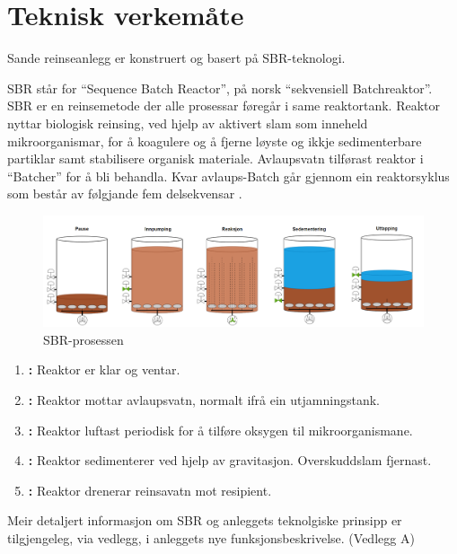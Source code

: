 \newpage
\section{Teknisk verkemåte}
\thispagestyle{fancy}
Sande reinseanlegg er konstruert og basert på \gls{SBR}-teknologi.

\gls{SBR} står for ``Sequence \Gls{Batch} Reactor'', på norsk ``sekvensiell \gls{Batch}reaktor''.\newline
\gls{SBR} er en reinsemetode der alle prosessar føregår i same reaktortank. 
Reaktor nyttar biologisk reinsing, ved hjelp av aktivert slam som inneheld mikroorganismar, for å koagulere 
og å fjerne løyste og ikkje sedimenterbare partiklar samt stabilisere organisk materiale. 
Avlaupsvatn tilførast reaktor i ``\gls{Batch}er'' for å bli behandla. 
Kvar avlaups-\gls{Batch} går gjennom ein reaktorsyklus som består av følgjande fem delsekvensar \citep{Statsforvalter}.
\newline

\begin{figure}[htbp]
    \centering
    \includegraphics[width=1\textwidth]{Figurar/SBR-V2.png}
    \caption{\gls{SBR}-prosessen}\label{fig:SBR-Prosessen}
\end{figure}


\begin{enumerate}
    \item \textbf{:} Reaktor er klar og ventar.
    \item \textbf{:} Reaktor mottar avlaupsvatn, normalt ifrå ein utjamningstank.
    \item \textbf{:} Reaktor luftast periodisk for å tilføre oksygen til mikroorganismane.
    \item \textbf{:} Reaktor sedimenterer ved hjelp av gravitasjon. Overskuddslam fjernast.
    \item \textbf{:} Reaktor drenerar reinsavatn mot resipient.
\end{enumerate}

Meir detaljert informasjon om \gls{SBR} og anleggets teknolgiske prinsipp er tilgjengeleg, via vedlegg, i anleggets nye
funksjonsbeskrivelse. (Vedlegg A)

